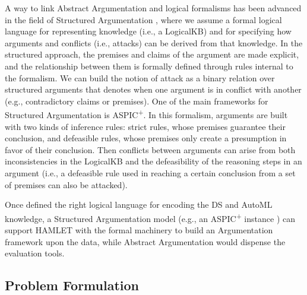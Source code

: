 A way to link Abstract Argumentation and logical formalisms has been advanced in the field of Structured Argumentation \cite{BesnardGHMPST14structured}, where we assume a formal logical language for representing knowledge (i.e., a LogicalKB) and for specifying how arguments and conflicts (i.e., attacks) can be derived from that knowledge. 
In the structured approach, the premises and claims of the argument are made explicit, and the relationship between them is formally defined through rules internal to the formalism.
We can build the notion of attack as a binary relation over structured arguments that denotes when one argument is in conflict with another (e.g., contradictory claims or premises).
One of the main frameworks for Structured Argumentation is ASPIC\textsuperscript{+}\cite{Modgil2014aspic+}. 
In this formalism, arguments are built with two kinds of inference rules: strict rules, whose premises guarantee their conclusion, and defeasible rules, whose premises only create a presumption in favor of their conclusion. 
Then conflicts between arguments can arise from both inconsistencies in the LogicalKB and the defeasibility of the reasoning steps in an argument (i.e., a defeasible rule used in reaching a certain conclusion from a set of premises can also be attacked).

Once defined the right logical language for encoding the DS and AutoML knowledge, a Structured Argumentation model (e.g., an ASPIC\textsuperscript{+} instance \cite{arg2p-jlc}) can support HAMLET with the formal machinery to build an Argumentation framework upon the data, while Abstract Argumentation would dispense the evaluation tools.

\subsection{Problem Formulation}\label{ssec:problem}

